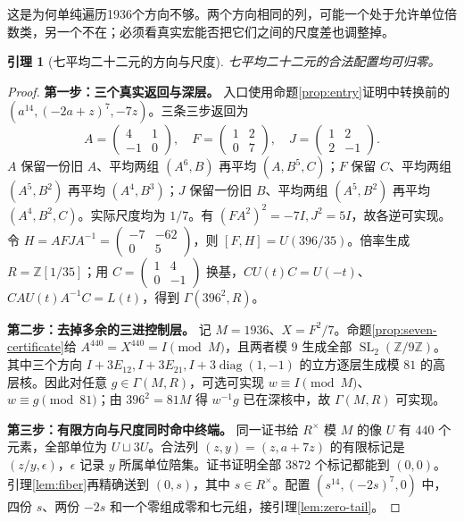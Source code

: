 \documentclass[11pt,a4paper,oneside,openany]{book}
\newcommand{\Z}{\mathbb Z}
\newcommand{\SL}{\operatorname{SL}}
\newcommand{\diag}{\operatorname{diag}}
\newtheorem{lemma}[theorem]{引理}
\theoremstyle{definition}
\numberwithin{equation}{chapter}
\begin{document}
这是为何单纯遍历1936个方向不够。两个方向相同的列，可能一个处于允许单位倍数类，另一个不在；必须看真实宏能否把它们之间的尺度差也调整掉。
\begin{lemma}[七平均二十二元的方向与尺度]\label{lem:seven22}
七平均二十二元的合法配置均可归零。
\end{lemma}
\begin{proof}

\par\noindent\textbf{第一步：三个真实返回与深层。}
入口使用命题\ref{prop:entry}证明中转换前的 $(a^{14},(-2a+z)^7,-7z)$。三条三步返回为
\[
A=\begin{pmatrix}4&1\\-1&0\end{pmatrix},\quad
F=\begin{pmatrix}1&2\\0&7\end{pmatrix},\quad
J=\begin{pmatrix}1&2\\2&-1\end{pmatrix}.
\]
$A$ 保留一份旧 $A$、平均两组 $(A^6,B)$ 再平均 $(A,B^5,C)$；$F$ 保留 $C$、平均两组 $(A^5,B^2)$ 再平均 $(A^4,B^3)$；$J$ 保留一份旧 $B$、平均两组 $(A^5,B^2)$ 再平均 $(A^4,B^2,C)$。实际尺度均为 $1/7$。有 $(FA^2)^2=-7I,J^2=5I$，故各逆可实现。
令 $H=AFJA^{-1}=\left(\begin{smallmatrix}-7&-62\\0&5\end{smallmatrix}\right)$，则 $[F,H]=U(396/35)$。倍率生成 $R=\Z[1/35]$；用 $C=\left(\begin{smallmatrix}1&4\\0&-1\end{smallmatrix}\right)$ 换基，$CU(t)C=U(-t)$、$CAU(t)A^{-1}C=L(t)$，得到 $\Gamma(396^2,R)$。

\par\noindent\textbf{第二步：去掉多余的三进控制层。}
记 $M=1936$、$X=F^2/7$。命题\ref{prop:seven-certificate}给 $A^{440}=X^{440}=I\pmod M$，且两者模 $9$ 生成全部 $\SL_2(\Z/9\Z)$。其中三个方向 $I+3E_{12},I+3E_{21},I+3\diag(1,-1)$ 的立方逐层生成模 $81$ 的高层核。因此对任意 $g\in\Gamma(M,R)$，可选可实现 $w\equiv I\pmod M$、$w\equiv g\pmod{81}$；由 $396^2=81M$ 得 $w^{-1}g$ 已在深核中，故 $\Gamma(M,R)$ 可实现。

\par\noindent\textbf{第三步：有限方向与尺度同时命中终端。}
同一证书给 $R^\times$ 模 $M$ 的像 $U$ 有 $440$ 个元素，全部单位为 $U\sqcup3U$。合法列 $(z,y)=(z,a+7z)$ 的有限标记是 $(z/y,\epsilon)$，$\epsilon$ 记录 $y$ 所属单位陪集。证书证明全部 $3872$ 个标记都能到 $(0,0)$。引理\ref{lem:fiber}再精确送到 $(0,s)$，其中 $s\in R^\times$。配置 $(s^{14},(-2s)^7,0)$ 中，四份 $s$、两份 $-2s$ 和一个零组成零和七元组，接引理\ref{lem:zero-tail}。
\end{proof}
\end{document}
